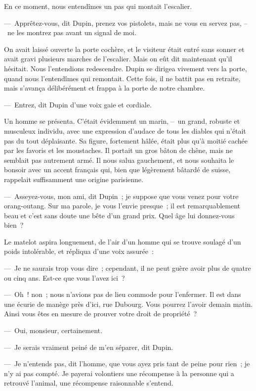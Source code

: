 \documentclass[french,twoside]{book} %
\begin{document}
En ce moment, nous entendîmes un pas qui montait l’escalier.\par
— Apprêtez-vous, dit Dupin, prenez vos pistolets, mais ne vous en servez pas, – ne les montrez pas avant un signal de moi.\par
On avait laissé ouverte la porte cochère, et le visiteur était entré sans sonner et avait gravi plusieurs marches de l’escalier. Mais on eût dit maintenant qu’il hésitait. Nous l’entendions redescendre. Dupin se dirigea vivement vers la porte, quand nous l’entendîmes qui remontait. Cette fois, il ne battit pas en retraite, mais s’avança délibérément et frappa à la porte de notre chambre.\par
— Entrez, dit Dupin d’une voix gaie et cordiale.\par
Un homme se présenta. C’était évidemment un marin, – un grand, robuste et musculeux individu, avec une expression d’audace de tous les diables qui n’était pas du tout déplaisante. Sa figure, fortement hâlée, était plus qu’à moitié cachée par les favoris et les moustaches. Il portait un gros bâton de chêne, mais ne semblait pas autrement armé. Il nous salua gauchement, et nous souhaita le bonsoir avec un accent français qui, bien que légèrement bâtardé de suisse, rappelait suffisamment une origine parisienne.\par
— Asseyez-vous, mon ami, dit Dupin ; je suppose que vous venez pour votre orang-outang. Sur ma parole, je vous l’envie presque ; il est remarquablement beau et c’est sans doute une bête d’un grand prix. Quel âge lui donnez-vous bien ?\par
Le matelot aspira longuement, de l’air d’un homme qui se trouve soulagé d’un poids intolérable, et répliqua d’une voix assurée :\par
— Je ne saurais trop vous dire ; cependant, il ne peut guère avoir plus de quatre ou cinq ans. Est-ce que vous l’avez ici ?\par
— Oh ! non ; nous n’avions pas de lieu commode pour l’enfermer. Il est dans une écurie de manège près d’ici, rue Dubourg. Vous pourrez l’avoir demain matin. Ainsi vous êtes en mesure de prouver votre droit de propriété ?\par
— Oui, monsieur, certainement.\par
— Je serais vraiment peiné de m’en séparer, dit Dupin.\par
— Je n’entends pas, dit l’homme, que vous ayez pris tant de peine pour rien ; je n’y ai pas compté. Je payerai volontiers une récompense à la personne qui a retrouvé l’animal, une récompense raisonnable s’entend.\par
\end{document}
